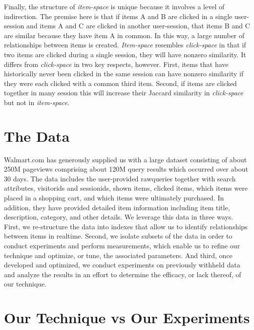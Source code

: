 Finally, the structure of {\em item-space} is unique because it involves a level of indirection. The premise here is that if items A and B are clicked in a single user-session and items A and C are clicked in another user-session, that items B and C are similar because they have item A in common. In this way, a large number of relationships between items is created. {\em Item-space} resembles {\em click-space} in that if two items are clicked during a single session, they will have nonzero similarity. It differs from {\em click-space} in two key respects, however. First, items that have historically never been clicked in the same session can have nonzero similarity if they were each clicked with a common third item. Second, if items are clicked together in many session this will increase their Jaccard similarity in {\em click-space} but not in {\em item-space}.

\section{The Data}

Walmart.com has generously supplied us with a large dataset consisting of about 250M pageviews comprising about 120M query results which occurred over about 30 days. The data includes the user-provided rawqueries together with search attributes, visitorids and sessionids, shown items, clicked items, which items were placed in a shopping cart, and which items were ultimately purchased. In addition, they have provided detailed item information including item title, description, category, and other details. We leverage this data in three ways. First, we re-structure the data into indexes that allow us to identify relationships between items in realtime. Second, we isolate subsets of the data in order to conduct experiments and perform measurements, which enable us to refine our technique and optimize, or tune, the associated parameters. And third, once developed and optimized, we conduct experiments on previously withheld data and analyze the results in an effort to determine the efficacy, or lack thereof, of our technique. 

\section{Our Technique vs Our Experiments}


